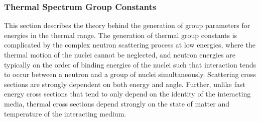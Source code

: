 \subsubsection{Thermal Spectrum Group Constants}
This section describes the theory behind the generation of group parameters for energies in the thermal range. The generation of thermal group constants is complicated by the complex neutron scattering process at low energies, where the thermal motion of the nuclei cannot be neglected, and neutron energies are typically on the order of binding energies of the nuclei such that interaction tends to occur between a neutron and a group of nuclei simultaneously. Scattering cross sections are strongly dependent on both energy and angle. Further, unlike fast energy cross sections that tend to only depend on the identity of the interacting media, thermal cross sections depend strongly on the state of matter and temperature of the interacting medium.
